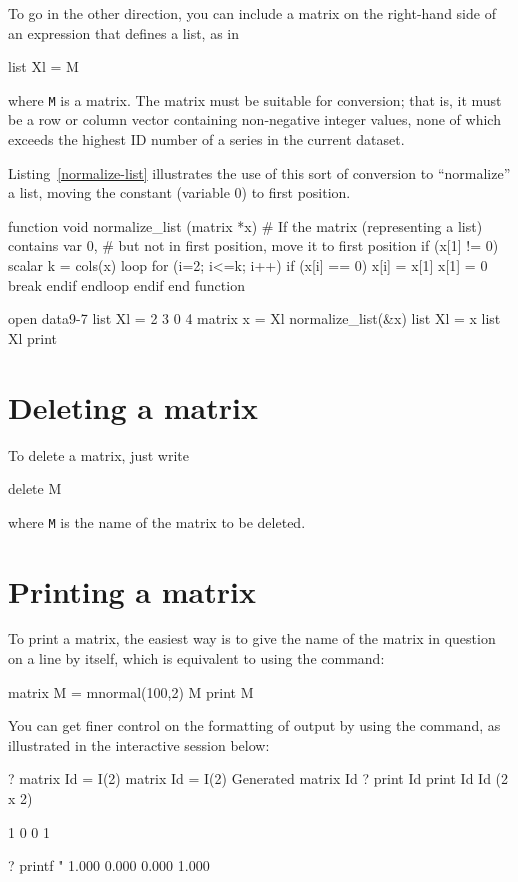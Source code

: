 To go in the other direction, you can include a matrix on the
right-hand side of an expression that defines a list, as in
%
\begin{code}
list Xl = M
\end{code}
%
where \texttt{M} is a matrix.  The matrix must be suitable for
conversion; that is, it must be a row or column vector containing
non-negative integer values, none of which exceeds the highest ID
number of a series in the current dataset.

Listing~\ref{normalize-list} illustrates the use of this sort of
conversion to ``normalize'' a list, moving the constant (variable 0)
to first position.

\begin{script}[htbp]
  \label{normalize-list}
\begin{scode}
function void normalize_list (matrix *x)
  # If the matrix (representing a list) contains var 0,
  # but not in first position, move it to first position
  if (x[1] != 0)
     scalar k = cols(x)
     loop for (i=2; i<=k; i++)
        if (x[i] == 0)
            x[i] = x[1]
            x[1] = 0
            break
         endif
     endloop
  endif
end function

open data9-7
list Xl = 2 3 0 4
matrix x = Xl
normalize_list(&x)
list Xl = x
list Xl print
\end{scode}
\end{script}


\section{Deleting a matrix}
\label{matrix-delete}

To delete a matrix, just write
%
\begin{code}
delete M
\end{code}
%
where \texttt{M} is the name of the matrix to be deleted.

\section{Printing a matrix}

To print a matrix, the easiest way is to give the name of the matrix
in question on a line by itself, which is equivalent to using the
 command:
%
\begin{code}
matrix M = mnormal(100,2)
M
print M
\end{code}

You can get finer control on the formatting of output by using the
 command, as illustrated in the interactive session below:
%
\begin{code}
? matrix Id = I(2)
 matrix Id = I(2)
Generated matrix Id
? print Id
 print Id
Id (2 x 2)

  1   0 
  0   1 

? printf "%
     1.000     0.000
     0.000     1.000
\end{code}

